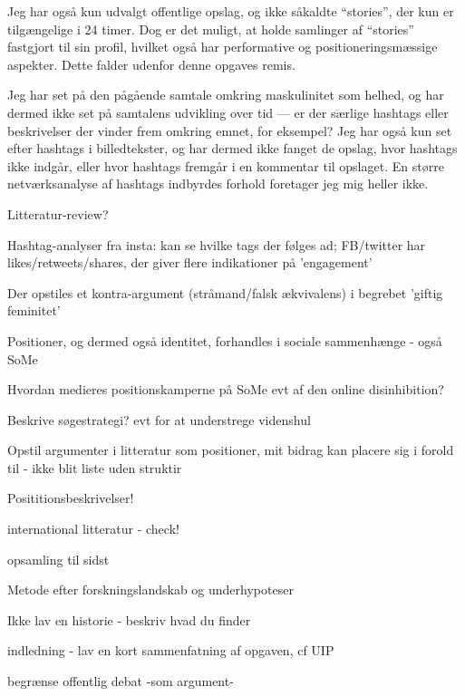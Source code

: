 Jeg har også kun udvalgt offentlige opslag, og ikke såkaldte 
“stories”, der kun er tilgængelige i 24 timer. Dog er det muligt, 
at holde samlinger af “stories” fastgjort til sin profil, hvilket 
også har performative og positioneringsmæssige aspekter. Dette 
falder udenfor denne opgaves remis.

Jeg har set på den pågående samtale omkring maskulinitet som 
helhed, og har dermed ikke set på samtalens udvikling over tid — 
er der særlige hashtags eller beskrivelser der vinder frem omkring 
emnet, for eksempel? Jeg har også kun set efter hashtags i 
billedtekster, og har dermed ikke fanget de opslag, hvor hashtags 
ikke indgår, eller hvor hashtags fremgår i en kommentar til 
opslaget. En større netværksanalyse af hashtags indbyrdes forhold 
foretager jeg mig heller ikke.


Litteratur-review?

Hashtag-analyser fra insta: kan se hvilke tags der følges ad;
FB/twitter har likes/retweets/shares, der giver flere indikationer
på 'engagement'

Der opstiles et kontra-argument (stråmand/falsk ækvivalens) i
begrebet 'giftig feminitet'

Positioner, og dermed også identitet, forhandles i sociale
sammenhænge - også SoMe 

Hvordan medieres positionskamperne på SoMe evt af den online
disinhibition?

Beskrive søgestrategi? evt for at understrege videnshul

Opstil argumenter i litteratur som positioner, mit bidrag kan
placere sig i forold til - ikke blit liste uden struktir

Posititionsbeskrivelser!

international litteratur - check! 

opsamling til sidst

Metode efter forskningslandskab og underhypoteser

Ikke lav en historie - beskriv hvad du finder

indledning - lav en kort sammenfatning af opgaven, cf UIP

begrænse offentlig debat -som argument-

